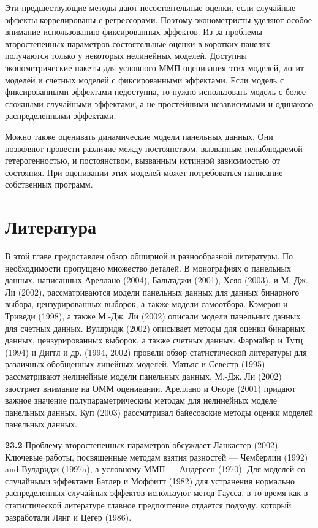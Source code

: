 Эти предшествующие методы дают несостоятельные оценки, если случайные эффекты коррелированы с регрессорами. Поэтому эконометристы уделяют особое внимание использованию фиксированных эффектов. Из-за проблемы второстепенных параметров состоятельные оценки в коротких панелях получаются только у некоторых нелинейных моделей. Доступны эконометрические пакеты для условного ММП оценивания этих моделей, логит-моделей и счетных моделей с фиксированными эффектами. Если модель с фиксированными эффектами недоступна, то нужно использовать модель с более сложными случайными эффектами, а не простейшими независимыми и одинаково распределенными эффектами.

Можно также оценивать динамические модели панельных данных. Они позволяют провести различие между постоянством, вызванным ненаблюдаемой гетерогенностью, и постоянством, вызванным истинной зависимостью от состояния. При оценивании этих моделей может потребоваться написание собственных программ.


\section{Литература}

В этой главе предоставлен обзор обширной и разнообразной литературы. По необходимости пропущено множество деталей. В монографиях о панельных данных, написанных Ареллано (2004), Бальтаджи (2001), Хсяо (2003), и М.-Дж. Ли (2002), рассматриваются модели панельных данных для данных бинарного выбора, цензурированных выборок, а также модели самоотбора. Кэмерон и Триведи (1998), а также М.-Дж. Ли (2002) описали модели панельных данных для счетных данных. Вулдридж (2002) описывает методы для оценки бинарных данных, цензурированных выборок, а также счетных данных. Фармайер и Тутц (1994) и Диггл и др. (1994, 2002) провели обзор статистической литературы для различных обобщенных линейных моделей. Матьяс и Севестр (1995) рассматривают нелинейные модели панельных данных. М.-Дж. Ли (2002) заостряет внимание на ОММ оценивании. Ареллано и Оноре (2001) придают важное значение полупараметрическим методам для нелинейных моделе панельных данных. Куп (2003) рассматривал байесовские методы оценки моделей панельных данных.

\textbf{23.2} Проблему второстепенных параметров обсуждает Ланкастер (2002). Ключевые работы, посвященные методам взятия разностей ---  Чемберлин (1992) and Вулдридж (1997a), а условному ММП --- Андерсен (1970). Для моделей со случайными эффектами Батлер и Моффитт (1982) для устранения нормально распределенных случайных эффектов используют метод Гаусса, в то время как в статистической литературе главное предпочтение отдается подходу, который разработали Лянг и Цегер (1986).

